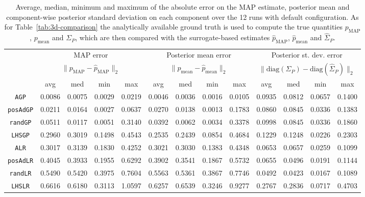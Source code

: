 \begin{table}

    \begin{centering}
        
    
    \hspace*{-1.5cm}
    \begin{tabular}{ccccccccccccc}
    \toprule
        & \multicolumn{4}{c}{MAP error}  & \multicolumn{4}{c}{Posterior mean error} & \multicolumn{4}{c}{Posterior st. dev. error} \\ 
        & \multicolumn{4}{c}{$ \|p_\text{MAP} - \hat p _\text{MAP}\|_2 $}  & \multicolumn{4}{c}{$ \|p_\text{mean} - \hat p _\text{mean}\|_2 $} & \multicolumn{4}{c}{$\| \text{diag}(\Sigma_P) - \text{diag}( \hat \Sigma _P) \|_2$} \\ 
        & avg   & med   & min   & max   & avg   & med   & min   & max   & avg   & med   & min   & max \\
        \midrule
        \texttt{AGP}
        & 0.0086 & 0.0075 & 0.0029 & 0.0219
        & 0.0046 & 0.0036 & 0.0016 & 0.0105
        & 0.0935 & 0.0812 & 0.0657 & 0.1400 \\
        \texttt{posAdGP}
        & 0.0211 & 0.0164 & 0.0027 & 0.0637
        & 0.0270 & 0.0138 & 0.0013 & 0.1783
        & 0.0860 & 0.0845 & 0.0336 & 0.1383 \\
        \texttt{randGP}
        & 0.0511 & 0.0117 & 0.0051 & 0.3140
        & 0.0392 & 0.0062 & 0.0034 & 0.3378
        & 0.0998 & 0.0845 & 0.0336 & 0.1860 \\
        \texttt{LHSGP}
        & 0.2960 & 0.3019 & 0.1498 & 0.4543 
        & 0.2535 & 0.2439 & 0.0854 & 0.4684
        & 0.1229 & 0.1248 & 0.0226 & 0.2303 \\
        \texttt{ALR}
        & 0.3017 & 0.3139 & 0.1830 & 0.4252
        & 0.3021 & 0.3030 & 0.1383 & 0.4348
        & 0.0653 & 0.0657 & 0.0259 & 0.1099 \\
        \texttt{posAdLR}
        & 0.4045 & 0.3933 & 0.1955 & 0.6292
        & 0.3902 & 0.3541 & 0.1867 & 0.5732
        & 0.0655 & 0.0496 & 0.0191 & 0.1144 \\
        \texttt{randLR}
        & 0.5490 & 0.5420 & 0.3975 & 0.7604
        & 0.5563 & 0.5361 & 0.3867 & 0.7746
        & 0.0492 & 0.0423 & 0.0167 & 0.1089\\
        \texttt{LHSLR}
        & 0.6616 & 0.6180 & 0.3113 & 1.0597
        & 0.6257 & 0.6539 & 0.3246 & 0.9277
        & 0.2767 & 0.2836 & 0.0717 & 0.4703\\
        
    \bottomrule
    \end{tabular}
    \caption{Average, median, minimum and maximum of the absolute error on the MAP estimate, posterior mean and component-wise posterior standard deviation on each component over the 12 runs with default configuration.
    As for Table~\ref{tab:3d-comparison} the analytically available ground truth is used to compute the true quantities $p_\text{MAP}$, $p_\text{mean}$ and $\Sigma_P$, which are then compared with the surrogate-based estimates $\hat p_\text{MAP}$, $\hat p_\text{mean}$ and $\hat \Sigma_P$.
    }
    \label{tab:6d-comparison}
\end{centering}
\end{table}

